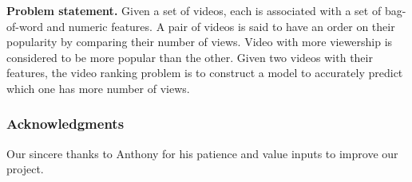 \documentclass{article} %
\begin{document}
\textbf{Problem statement.} Given a set of videos, each is associated with a set of bag-of-word and numeric features. A pair of videos is said to have an order on their popularity by comparing their number of views. Video with more viewership is considered to be more popular than the other. Given two videos with their features, the video ranking problem is to construct a model to accurately predict which one has more number of views.



	


		 



\subsubsection*{Acknowledgments}

Our sincere thanks to Anthony for his patience and value inputs to improve our project.


\end{document}
